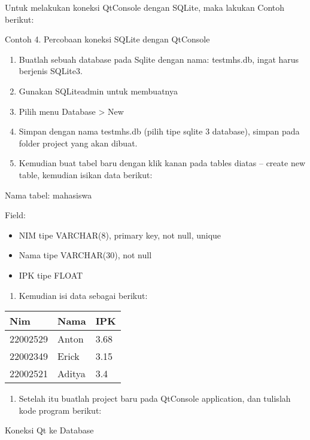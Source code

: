 Untuk melakukan koneksi QtConsole dengan SQLite, maka lakukan Contoh
berikut:

Contoh 4. Percobaan koneksi SQLite dengan QtConsole

\begin{enumerate}
\def\labelenumi{\arabic{enumi}.}
\tightlist
\item
  Buatlah sebuah database pada Sqlite dengan nama: testmhs.db, ingat
  harus berjenis SQLite3.
\item
  Gunakan SQLiteadmin untuk membuatnya
\item
  Pilih menu Database \textgreater{} New
\item
  Simpan dengan nama testmhs.db (pilih tipe sqlite 3 database), simpan
  pada folder project yang akan dibuat.
\item
  Kemudian buat tabel baru dengan klik kanan pada tables diatas --
  create new table, kemudian isikan data berikut:
\end{enumerate}

Nama tabel: mahasiswa

Field:

\begin{itemize}
\tightlist
\item
  NIM tipe VARCHAR(8), primary key, not null, unique
\item
  Nama tipe VARCHAR(30), not null
\item
  IPK tipe FLOAT
\end{itemize}

\begin{enumerate}
\def\labelenumi{\arabic{enumi}.}
\setcounter{enumi}{5}
\tightlist
\item
  Kemudian isi data sebagai berikut:
\end{enumerate}

\begin{longtable}[]{@{}lll@{}}
\toprule
Nim & Nama & IPK\tabularnewline
\midrule
\endhead
22002529 & Anton & 3.68\tabularnewline
22002349 & Erick & 3.15\tabularnewline
22002521 & Aditya & 3.4\tabularnewline
\bottomrule
\end{longtable}

\begin{enumerate}
\def\labelenumi{\arabic{enumi}.}
\setcounter{enumi}{6}
\tightlist
\item
  Setelah itu buatlah project baru pada QtConsole application, dan
  tulislah kode program berikut:
\end{enumerate}

Koneksi Qt ke Database

